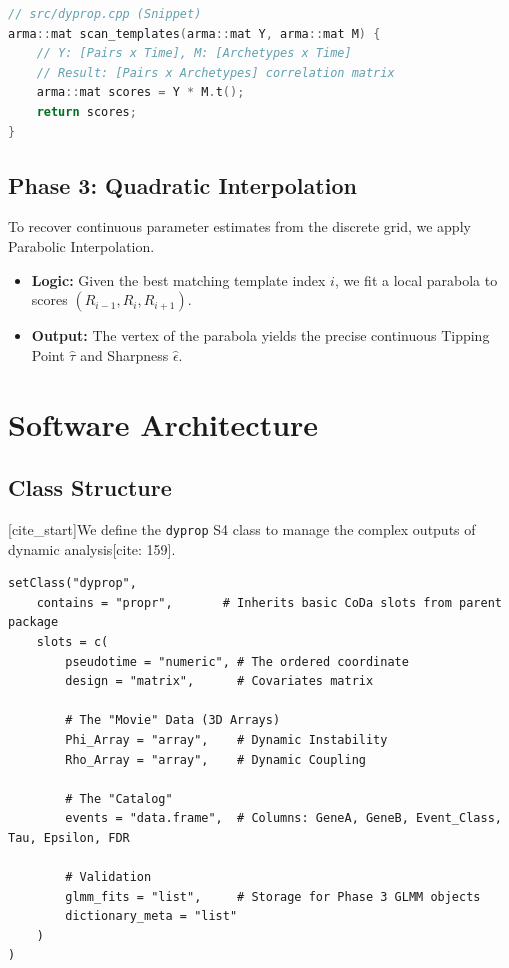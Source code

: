 \documentclass[11pt, a4paper]{article}
\begin{document}
\begin{lstlisting}[language=C++]
// src/dyprop.cpp (Snippet)
arma::mat scan_templates(arma::mat Y, arma::mat M) {
    // Y: [Pairs x Time], M: [Archetypes x Time]
    // Result: [Pairs x Archetypes] correlation matrix
    arma::mat scores = Y * M.t(); 
    return scores;
}
\end{lstlisting}

\subsection{Phase 3: Quadratic Interpolation}
To recover continuous parameter estimates from the discrete grid, we apply Parabolic Interpolation.
\begin{itemize}
    \item \textbf{Logic:} Given the best matching template index $i$, we fit a local parabola to scores $(R_{i-1}, R_i, R_{i+1})$.
    \item \textbf{Output:} The vertex of the parabola yields the precise continuous Tipping Point $\hat{\tau}$ and Sharpness $\hat{\epsilon}$.
\end{itemize}

\section{Software Architecture}

\subsection{Class Structure}
[cite_start]We define the \texttt{dyprop} S4 class to manage the complex outputs of dynamic analysis[cite: 159].

\begin{lstlisting}
setClass("dyprop",
    contains = "propr",       # Inherits basic CoDa slots from parent package
    slots = c(
        pseudotime = "numeric", # The ordered coordinate
        design = "matrix",      # Covariates matrix 
        
        # The "Movie" Data (3D Arrays)
        Phi_Array = "array",    # Dynamic Instability
        Rho_Array = "array",    # Dynamic Coupling
        
        # The "Catalog"
        events = "data.frame",  # Columns: GeneA, GeneB, Event_Class, Tau, Epsilon, FDR
        
        # Validation
        glmm_fits = "list",     # Storage for Phase 3 GLMM objects
        dictionary_meta = "list"
    )
)
\end{lstlisting}
\end{document}
